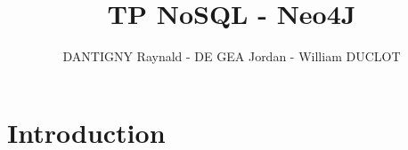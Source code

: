 \documentclass[a4paper,oneside,1pt]{article}
\title{TP NoSQL - Neo4J}
\author{DANTIGNY Raynald - DE GEA Jordan - William DUCLOT}
\begin{document}
\maketitle

\section{Introduction}
\end{document}
